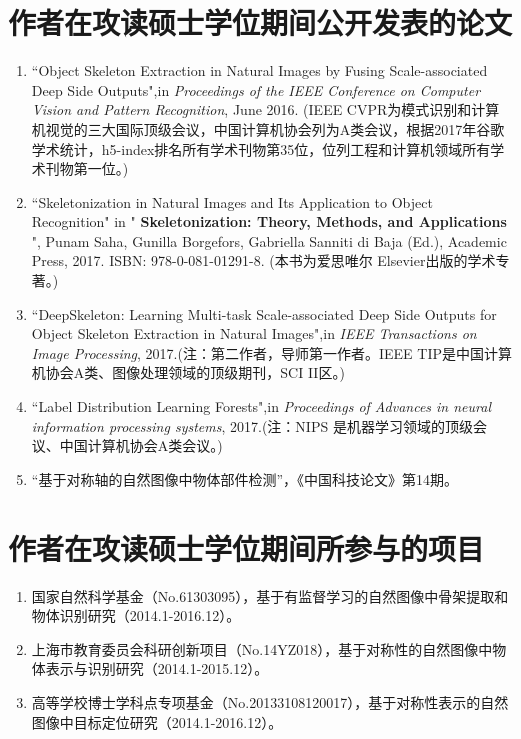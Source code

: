 \documentclass[UTF8]{ctexart}
\numberwithin{equation}{section} %
\numberwithin{table}{section} %
\begin{document}
\section*{作者在攻读硕士学位期间公开发表的论文}
\begin{enumerate}
\item “Object Skeleton Extraction in Natural Images by Fusing Scale-associated Deep Side Outputs",in \emph{Proceedings of the IEEE Conference on Computer Vision and Pattern Recognition}, June 2016.
(IEEE CVPR为模式识别和计算机视觉的三大国际顶级会议，中国计算机协会列为A类会议，根据2017年谷歌学术统计，h5-index排名所有学术刊物第35位，位列工程和计算机领域所有学术刊物第一位。)

\item “Skeletonization in Natural Images and Its Application to Object Recognition" in "\textbf{ Skeletonization: Theory, Methods, and Applications }", Punam Saha, Gunilla Borgefors, Gabriella Sanniti di Baja (Ed.), 
Academic Press, 2017. ISBN: 978-0-081-01291-8. (本书为爱思唯尔 Elsevier出版的学术专著。)

\item “DeepSkeleton: Learning Multi-task Scale-associated Deep Side Outputs for Object Skeleton Extraction in Natural Images",in \emph{IEEE Transactions on Image Processing}, 2017.(注：第二作者，导师第一作者。IEEE TIP是中国计算机协会A类、图像处理领域的顶级期刊，SCI II区。)

\item “Label Distribution Learning Forests",in \emph{Proceedings of Advances in neural information processing systems}, 2017.(注：NIPS 是机器学习领域的顶级会议、中国计算机协会A类会议。)

\item “基于对称轴的自然图像中物体部件检测”，《中国科技论文》第14期。

\end{enumerate}

\pagebreak
\section*{作者在攻读硕士学位期间所参与的项目}
\begin{enumerate}
\item 国家自然科学基金（No.61303095），基于有监督学习的自然图像中骨架提取和物体识别研究（2014.1-2016.12）。
\item 上海市教育委员会科研创新项目（No.14YZ018），基于对称性的自然图像中物体表示与识别研究（2014.1-2015.12）。
\item 高等学校博士学科点专项基金（No.20133108120017），基于对称性表示的自然图像中目标定位研究（2014.1-2016.12）。

\end{enumerate}
\end{document}

